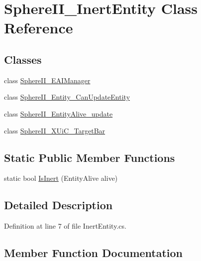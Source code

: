 \hypertarget{class_sphere_i_i___inert_entity}{}\section{Sphere\+I\+I\+\_\+\+Inert\+Entity Class Reference}
\label{class_sphere_i_i___inert_entity}
\subsection*{Classes}
\begin{DoxyCompactItemize}
\item 
class \mbox{\hyperlink{class_sphere_i_i___inert_entity_1_1_sphere_i_i___e_a_i_manager}{Sphere\+I\+I\+\_\+\+E\+A\+I\+Manager}}
\item 
class \mbox{\hyperlink{class_sphere_i_i___inert_entity_1_1_sphere_i_i___entity___can_update_entity}{Sphere\+I\+I\+\_\+\+Entity\+\_\+\+Can\+Update\+Entity}}
\item 
class \mbox{\hyperlink{class_sphere_i_i___inert_entity_1_1_sphere_i_i___entity_alive__update}{Sphere\+I\+I\+\_\+\+Entity\+Alive\+\_\+update}}
\item 
class \mbox{\hyperlink{class_sphere_i_i___inert_entity_1_1_sphere_i_i___x_ui_c___target_bar}{Sphere\+I\+I\+\_\+\+X\+Ui\+C\+\_\+\+Target\+Bar}}
\end{DoxyCompactItemize}
\subsection*{Static Public Member Functions}
\begin{DoxyCompactItemize}
\item 
static bool \mbox{\hyperlink{class_sphere_i_i___inert_entity_a74a77de2b223a5700f43585ddca349dd}{Is\+Inert}} (Entity\+Alive alive)
\end{DoxyCompactItemize}


\subsection{Detailed Description}


Definition at line 7 of file Inert\+Entity.\+cs.



\subsection{Member Function Documentation}
\mbox{\label{class_sphere_i_i___inert_entity_a74a77de2b223a5700f43585ddca349dd}} 
